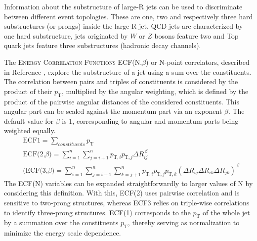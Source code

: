 Information about the substructure of large-R jets can be used to discriminate between different event topologies. These are one, two and respectively three hard substructures (or prongs) inside the large-R jet. QCD jets are characterized by one hard substructure, jets originated by $W$ or $Z$ bosons feature two and Top quark jets feature three substructures (hadronic decay channels).

The \textsc{Energy Correlation Functions} ECF(N,$\beta$) or N-point correlators, described in Reference \cite{bib:ECF}, explore the substructure of a jet using a sum over the constituents. The correlation between pairs and triples of constituents is considered by the product of their $p_{\mathrm{T}}$, multiplied by the angular weighting, which is defined by the product of the pairwise angular distances of the considered constituents. This angular part can be scaled against the momentum part via an exponent $\beta$. The default value for $\beta$ is 1, corresponding to angular and momentum parts being weighted equally.
\begin{equation}
\begin{aligned}
 & \text{ECF1}  ={} \sum\limits_{constituents} p_{\mathrm{T}} \\ 
 & \text{ECF(2,$\beta$)} ={} \sum\limits_{i=1}^n \sum\limits_{j=i+1}^n p_{\mathrm{T},i}p_{\mathrm{T},j}\Delta R_{ij}^{\,\beta} \\ 
 & \text{(ECF(3,$\beta$)} ={} \sum\limits_{i=1}^n \sum\limits_{j=i+1}^n \sum\limits_{k=j+1}^n p_{\mathrm{T},i}p_{\mathrm{T},j}p_{\mathrm{T},k}(\Delta R_{ij} \Delta R_{ik} \Delta R_{jk})^{\,\beta}
\end{aligned}
\end{equation}\label{eq:ECF}
The ECF(N) variables can be expanded straightforwardly to larger values of N by considering this definition.
With this, ECF(2) uses pairwise correlation and is sensitive to two-prong structures, whereas ECF3 relies on triple-wise correlations to identify three-prong structures. ECF(1) corresponds to the $p_{\mathrm{T}}$ of the whole jet by a summation over the constituents $p_{\mathrm{T}}$, thereby serving as normalization to minimize the energy scale dependence.

